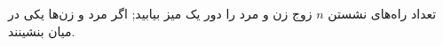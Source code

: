 \p
تعداد راه‌های نشستن $n$ 
زوج زن و مرد را دور یک میز بیابید; اگر
مرد و زن‌ها یکی در میان بنشینند.

